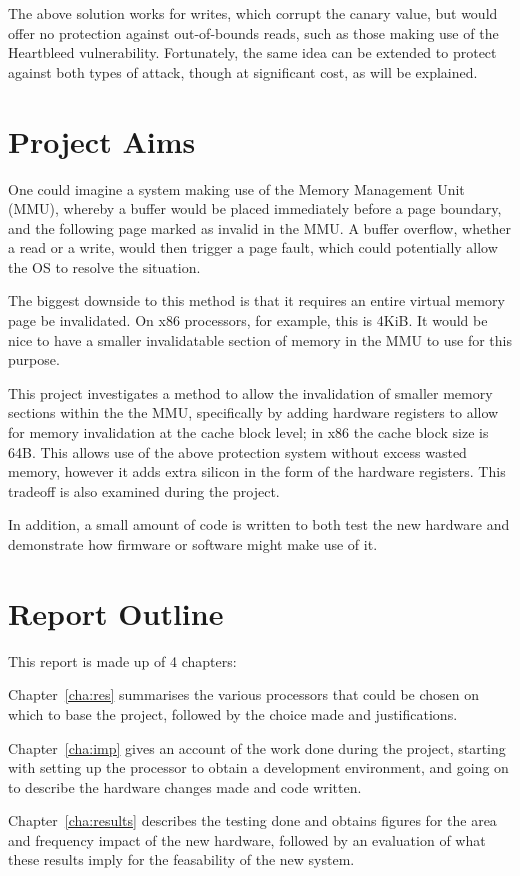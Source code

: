 The above solution works for writes, which corrupt the canary value, but would offer no protection against out-of-bounds reads, such as those making use of the Heartbleed vulnerability. Fortunately, the same idea can be extended to protect against both types of attack, though at significant cost, as will be explained.

\section{Project Aims}
One could imagine a system making use of the Memory Management Unit (MMU), whereby a buffer would be placed immediately before a page boundary, and the following page marked as invalid in the MMU. A buffer overflow, whether a read or a write, would then trigger a page fault, which could potentially allow the OS to resolve the situation.

The biggest downside to this method is that it requires an entire virtual memory page be invalidated. On x86 processors, for example, this is 4KiB. It would be nice to have a smaller invalidatable section of memory in the MMU to use for this purpose.

This project investigates a method to allow the invalidation of smaller memory sections within the the MMU, specifically by adding hardware registers to allow for memory invalidation at the cache block level; in x86 the cache block size is 64B. This allows use of the above protection system without excess wasted memory, however it adds extra silicon in the form of the hardware registers. This tradeoff is also examined during the project.

In addition, a small amount of code is written to both test the new hardware and demonstrate how firmware or software might make use of it.

\section{Report Outline}
This report is made up of 4 chapters:

Chapter~\ref{cha:res} summarises the various processors that could be chosen on which to base the project, followed by the choice made and justifications.

Chapter~\ref{cha:imp} gives an account of the work done during the project, starting with setting up the processor to obtain a development environment, and going on to describe the hardware changes made and code written.

Chapter~\ref{cha:results} describes the testing done and obtains figures for the area and frequency impact of the new hardware, followed by an evaluation of what these results imply for the feasability of the new system.